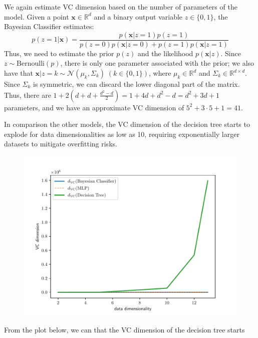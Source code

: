 \documentclass{exam}
\begin{document}
\begin{questions}
\begin{parts}
\begin{subparts}
                \item We again estimate VC dimension based on the number of parameters of the model. Given a point $\textbf{x} \in \mathbb{R}^{d}$ and a binary output variable $z \in \{0, 1\}$, the Bayesian Classifier estimates:
                \[
                    p(z = 1|\textbf{x}) = \frac{p(\textbf{x} | z = 1)p(z = 1)}{p(z = 0)p(\textbf{x} | z = 0) + p(z = 1)p(\textbf{x} | z = 1)}
                \] 
                Thus, we need to estimate the prior $p(z)$ and the likelihood $p(\textbf{x} | z)$. Since $z \sim \text{Bernoulli}(p)$, there is only one parameter associated with the prior; we also have that $\textbf{x}|z = k \sim \mathcal{N}(\mu_k, \Sigma_k) \; (k \in \{0,1\})$, where $\mu_k \in \mathbb{R}^{d}$ and $\Sigma_k \in \mathbb{R}^{d \times d}$. Since $\Sigma_k$ is symmetric, we can discard the lower diagonal part of the matrix. Thus, there are $1 + 2(d + d + \frac{d^2 - d}{2}) = 1 + 4d + d^2 - d = d^2 + 3d + 1$ parameters, and we have an approximate VC dimension of $5^2 + 3 \cdot 5 + 1 = 41$.
            \end{subparts}
            \item In comparison the other models, the VC dimension of the decision tree starts to explode for data dimensionalities as low as 10, requiring exponentially larger datasets to mitigate overfitting risks.
            \begin{figure}[H]
                \centering
                \includegraphics[scale = 0.75]{vc_4_a.pdf}
            \end{figure}
            \item From the plot below, we can that the VC dimension of the decision tree starts

\end{parts}
\end{questions}
\end{document}
